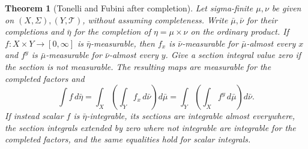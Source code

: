 \documentclass[11pt,oneside,openany]{book}
\newtheorem{theorem}{Theorem}[chapter]
\theoremstyle{definition}
\theoremstyle{remark}
\newcommand{\Eplus}{[0,\infty]}
\newcommand{\family}[1]{}
\begin{document}
\begin{theorem}[Tonelli and Fubini after completion]
\family{D11.08.completed_product}\label{d11:08:completed-product}
Let sigma-finite $\mu,\nu$ be given on $(X,\Sigma),(Y,\mathcal T)$,
without assuming completeness. Write $\bar\mu,\bar\nu$ for their
completions and $\bar\eta$ for the completion of
$\eta=\mu\times\nu$ on the ordinary product.
If $f:X\times Y\to\Eplus$ is $\bar\eta$-measurable, then $f_x$ is
$\bar\nu$-measurable for $\bar\mu$-almost every $x$ and $f^y$ is
$\bar\mu$-measurable for $\bar\nu$-almost every $y$. Give a section
integral value zero if the section is not measurable. The resulting maps
are measurable for the completed factors and
\[
 \int f\,d\bar\eta
 =\int_X\left(\int_Y f_x\,d\bar\nu\right)d\bar\mu
 =\int_Y\left(\int_X f^y\,d\bar\mu\right)d\bar\nu.
\]
If instead scalar $f$ is $\bar\eta$-integrable, its sections are
integrable almost everywhere, the section integrals extended by zero
where not integrable are integrable for the completed factors, and the
same equalities hold for scalar integrals.
\end{theorem}
\end{document}
